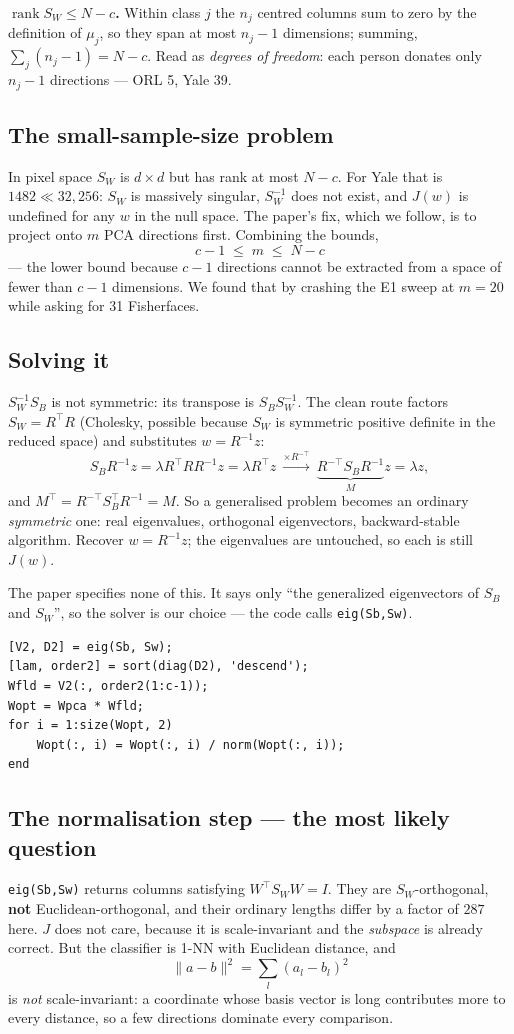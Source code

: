 \documentclass[11pt]{article}
\newcommand{\T}{^{\top}}
\begin{document}
\textbf{$\operatorname{rank}S_W\le N-c$.} Within class $j$ the $n_j$ centred
columns sum to zero by the definition of $\mu_j$, so they span at most $n_j-1$
dimensions; summing, $\sum_j(n_j-1)=N-c$. Read as \emph{degrees of freedom}:
each person donates only $n_j-1$ directions --- ORL 5, Yale 39.

\subsection{The small-sample-size problem}
In pixel space $S_W$ is $d\times d$ but has rank at most $N-c$. For Yale that
is $1482\ll32{,}256$: $S_W$ is massively singular, $S_W^{-1}$ does not exist,
and $J(w)$ is undefined for any $w$ in the null space. The paper's fix, which
we follow, is to project onto $m$ PCA directions first. Combining the bounds,
\[ \boxed{\,c-1\;\le\;m\;\le\;N-c\,} \]
--- the lower bound because $c-1$ directions cannot be extracted from a space
of fewer than $c-1$ dimensions. We found that by crashing the E1 sweep at
$m=20$ while asking for 31 Fisherfaces.

\subsection{Solving it}
$S_W^{-1}S_B$ is not symmetric: its transpose is $S_BS_W^{-1}$. The clean route
factors $S_W=R\T R$ (Cholesky, possible because $S_W$ is symmetric positive
definite in the reduced space) and substitutes $w=R^{-1}z$:
\[ S_BR^{-1}z=\lambda R\T RR^{-1}z=\lambda R\T z
   \ \xrightarrow{\times R^{-\top}}\
   \underbrace{R^{-\top}S_BR^{-1}}_{M}z=\lambda z, \]
and $M\T=R^{-\top}S_B\T R^{-1}=M$. So a generalised problem becomes an ordinary
\emph{symmetric} one: real eigenvalues, orthogonal eigenvectors, backward-stable
algorithm. Recover $w=R^{-1}z$; the eigenvalues are untouched, so each is still
$J(w)$.

The paper specifies none of this. It says only ``the generalized eigenvectors of
$S_B$ and $S_W$'', so the solver is our choice --- the code calls
\texttt{eig(Sb,Sw)}.

\begin{lstlisting}
[V2, D2] = eig(Sb, Sw);
[lam, order2] = sort(diag(D2), 'descend');
Wfld = V2(:, order2(1:c-1));
Wopt = Wpca * Wfld;
for i = 1:size(Wopt, 2)
    Wopt(:, i) = Wopt(:, i) / norm(Wopt(:, i));
end
\end{lstlisting}

\subsection{The normalisation step --- the most likely question}
\texttt{eig(Sb,Sw)} returns columns satisfying $W\T S_WW=I$. They are
$S_W$-orthogonal, \textbf{not} Euclidean-orthogonal, and their ordinary lengths
differ by a factor of $287$ here. $J$ does not care, because it is
scale-invariant and the \emph{subspace} is already correct. But the classifier
is 1-NN with Euclidean distance, and
\[ \|a-b\|^2=\sum_l (a_l-b_l)^2 \]
is \emph{not} scale-invariant: a coordinate whose basis vector is long
contributes more to every distance, so a few directions dominate every
comparison.
\end{document}

